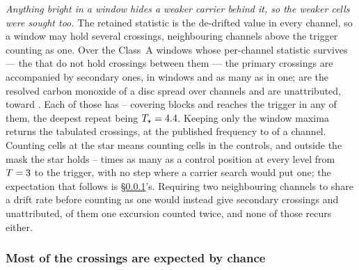\emph{Anything bright in a window hides a weaker carrier behind it, so the
weaker cells were sought too.} The retained statistic is the de-drifted value
in every channel, so a window may hold several crossings, neighbouring
channels above the trigger counting as one. Over the \CkNWin{} Class~A windows
whose per-channel statistic survives --- the \CkNWinNotCov{} that do not hold
\CkRegMiss{} crossings between them --- the \CkNPrimary{} primary crossings
are accompanied by
\CkNSecondaryWord{} secondary ones, in \CkNSecWin{} windows and as many as
\CkNSecMax{} in one; \CkNSecAttr{} are the resolved carbon monoxide of a disc
spread over channels and \CkNSecUnattrWord{} are unattributed, toward
\CkSecStars. Each of those \CkNSecUnattrWord{} has \CkCovLo--\CkCovHi{}
covering blocks and \CkNRecurWord{} reaches the trigger in any of them, the
deepest repeat being $T_\star=4.4$. Keeping only the window maxima
returns the \CkRegN{} tabulated crossings, at the published frequency to
\CkRegDev{} of a channel. Counting cells at the star means counting cells in
the controls, and outside the mask the star holds \CkRatioLo--\CkRatioHi{}
times as many as a control position at every level from $T=3$ to the
trigger, with no step where a carrier search would put one; the expectation
that follows is \S\ref{sec:trigunif}'s. Requiring two neighbouring channels to
share a drift rate before counting as one would instead give \CkRuleSec{}
secondary crossings and \CkRuleSecUnattr{} unattributed, \CkRuleSplit{} of
them one excursion counted twice, and none of those recurs either.

\subsubsection{Most of the crossings are expected by chance}
\label{sec:trigunif}

